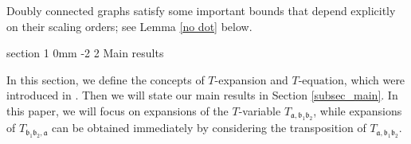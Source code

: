 \documentclass{article}
\makeatletter
\newcommand{\1}{\mathds{1}}
\numberwithin{equation}{section}
\newcommand{\fa}{{\mathfrak a}}
\newcommand{\fb}{{\mathfrak b}}
\theoremstyle{plain} %
\theoremstyle{remark}
\newtheorem{remark}[theorem]{Remark}
\newcommand{\incomp}{{\text{$T$-equation}}}
\renewcommand{\section}{\@startsection
	{section}%
	{1}%
	{0mm}%
	{-2\baselineskip}%
	{2\baselineskip}%
	{\normalfont\large\scshape\centering}} %
\renewcommand{\subsection}{\@startsection
	{subsection}%
	{2}%
	{0mm}%
	{-\baselineskip}%
	{0.5\baselineskip}%
	{\normalfont\bf\itshape}} %
\makeatother
\begin{document}
Doubly connected graphs satisfy some important bounds that depend explicitly on their scaling orders; see Lemma \ref{no dot} below. 















\section{Main results}\label{sec outline}


In this section, we define the concepts of $T$-expansion and $\incomp$, which were introduced in \cite[Section 2]{PartI_high}. 
Then we will state our main results in Section \ref{subsec_main}. In this paper, we will focus on expansions of the $T$-variable $T_{\fa,\fb_1 \fb_2}$, while expansions of $T_{\fb_1\fb_2,\fa}$ can be obtained immediately by considering the transposition of $T_{\fa,\fb_1 \fb_2}$.
 
\end{document}
